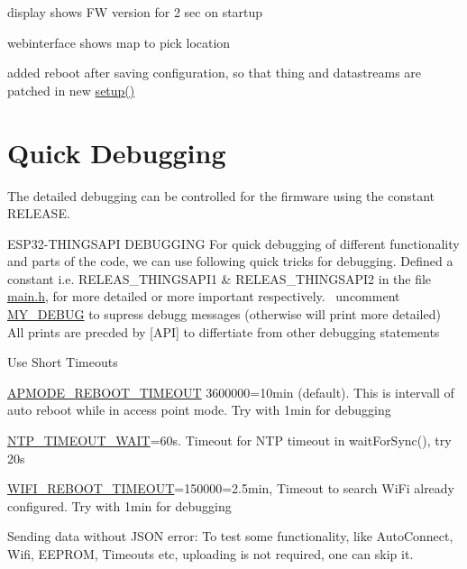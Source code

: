 \begin{DoxyItemize}
\begin{DoxyItemize}
\item display shows FW version for 2 sec on startup
\item webinterface shows map to pick location
\item added reboot after saving configuration, so that thing and datastreams are patched in new \mbox{\hyperlink{esp32-stationary_8ino_a4fc01d736fe50cf5b977f755b675f11d}{setup()}}
\end{DoxyItemize}
\end{DoxyItemize}\hypertarget{index_deb}{}\section{Quick Debugging}\label{index_deb}
The detailed debugging can be controlled for the firmware using the constant R\+E\+L\+E\+A\+SE.
\begin{DoxyEnumerate}
\item E\+S\+P32-\/\+T\+H\+I\+N\+G\+S\+A\+PI D\+E\+B\+U\+G\+G\+I\+NG For quick debugging of different functionality and parts of the code, we can use following quick tricks for debugging. Defined a constant i.\+e. R\+E\+L\+E\+A\+S\+\_\+\+T\+H\+I\+N\+G\+S\+A\+P\+I1 \& R\+E\+L\+E\+A\+S\+\_\+\+T\+H\+I\+N\+G\+S\+A\+P\+I2 in the file \mbox{\hyperlink{main_8h}{main.\+h}}, for more detailed or more important respectively.~\newline
 uncomment \mbox{\hyperlink{main_8h_a7e7232f278193dd8684f973ee70ef3f5}{M\+Y\+\_\+\+D\+E\+B\+UG}} to supress debugg messages (otherwise will print more detailed)~\newline
 All prints are precded by \mbox{[}A\+PI\mbox{]} to differtiate from other debugging statements
\item Use Short Timeouts
\begin{DoxyItemize}
\item \mbox{\hyperlink{main_8h_a8a1756fdd61bca61d188ce01ece876b9}{A\+P\+M\+O\+D\+E\+\_\+\+R\+E\+B\+O\+O\+T\+\_\+\+T\+I\+M\+E\+O\+UT}} 3600000=10min (default). This is intervall of auto reboot while in access point mode. Try with 1min for debugging
\item \mbox{\hyperlink{main_8h_ad8124687637087b9096f96b838f93400}{N\+T\+P\+\_\+\+T\+I\+M\+E\+O\+U\+T\+\_\+\+W\+A\+IT}}=60s. Timeout for N\+TP timeout in wait\+For\+Sync(), try 20s
\item \mbox{\hyperlink{my_auto_connect_8h_ab8e5b92436ed19ff04454974ca9b5140}{W\+I\+F\+I\+\_\+\+R\+E\+B\+O\+O\+T\+\_\+\+T\+I\+M\+E\+O\+UT}}=150000=2.\+5min, Timeout to search Wi\+Fi already configured. Try with 1min for debugging
\end{DoxyItemize}
\item Sending data without J\+S\+ON error\+: To test some functionality, like Auto\+Connect, Wifi, E\+E\+P\+R\+OM, Timeouts etc, uploading is not required, one can skip it.~\newline
 

\end{DoxyEnumerate}
